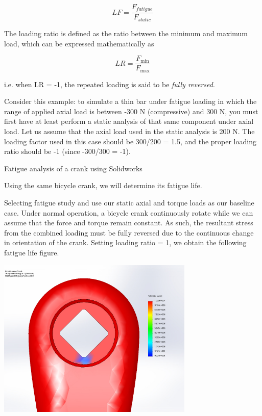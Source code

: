 \documentclass[a4paper,openany,12pt]{book}
\begin{document}
{{$$LF = \frac{F_{fatigue}}{F_{static}}$$

The loading ratio is defined as the ratio between the minimum and
maximum load, which can be expressed mathematically as

$$LR = \frac{F_{\min}}{F_{\max }}$$

i.e. when LR = -1, the repeated loading is said to be \emph{fully reversed}.

Consider this example: to simulate a thin bar under fatigue loading in
which the range of applied axial load is between -300 N (compressive)
and 300 N, you must first have at least perform a static analysis of
that same component under axial load. Let us assume that the axial load
used in the static analysis is 200 N. The loading factor used in this
case should be 300/200 = 1.5, and the proper loading ratio should be -1
(since -300/300 = -1).

Fatigue analysis of a crank using Solidworks

Using the same bicycle crank, we will determine its fatigue life.

Selecting fatigue study and use our static axial and torque loads as our
baseline case. Under normal operation, a bicycle crank continuously
rotate while we can assume that the force and torque remain constant. As
such, the resultant stress from the combined loading must be fully
reversed due to the continuous change in orientation of the crank.
Setting loading ratio = 1, we obtain the following fatigue life figure.

\begin{center}
\includegraphics[width=0.7\textwidth]{pictures/Intro-CAD/Crank-fatigue-front.jpg}
\end{center}

}}
\end{document}
